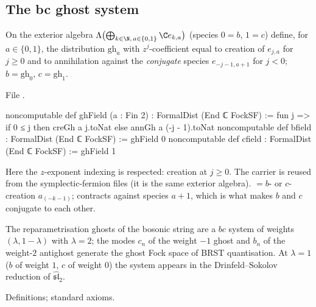 \subsection{The bc ghost system}\label{l17:sec:bc}

\begin{definition}[$bc$ fields]\label{l17:def:bc}
On the exterior algebra $\Lambda\bigl(\bigoplus_{k\in\N,\,a\in\{0,1\}}\C e_{k,a}\bigr)$ (species $0=b$,
$1=c$) define, for $a\in\{0,1\}$, the distribution $\mathrm{gh}_a$ with $z^j$-coefficient equal to
creation of $e_{j,a}$ for $j\ge0$ and to annihilation against the \emph{conjugate} species $e_{-j-1,a+1}$
for $j<0$; $b=\mathrm{gh}_0$, $c=\mathrm{gh}_1$.
\end{definition}
\noindent File .
\begin{leancode}
noncomputable def ghField (a : Fin 2) : FormalDist (End ℂ FockSF) :=
  fun j => if 0 ≤ j then creGh a j.toNat else annGh a (-j - 1).toNat
noncomputable def bfield : FormalDist (End ℂ FockSF) := ghField 0
noncomputable def cfield : FormalDist (End ℂ FockSF) := ghField 1
\end{leancode}
\begin{dictionary}
Here the $z$-exponent indexing is respected: creation at $j\ge0$. The carrier  is reused
from the symplectic-fermion files (it is the same exterior algebra).  $=b$- or
$c$-creation $a_{(-k-1)}$;  contracts against species $a+1$, which is what makes $b$
and $c$ conjugate to each other.
\end{dictionary}
\begin{physics}
The reparametrisation ghosts of the bosonic string are a $bc$ system of weights $(\lambda,1-\lambda)$
with $\lambda=2$; the modes $c_n$ of the weight $-1$ ghost and $b_n$ of the weight-$2$ antighost
generate the ghost Fock space of BRST quantisation. At $\lambda=1$ ($b$ of weight $1$, $c$ of
weight $0$) the system appears in the Drinfeld--Sokolov reduction of $\widehat{\mathfrak{sl}}_2$.
\end{physics}
\begin{status}
Definitions; standard axioms.
\end{status}

